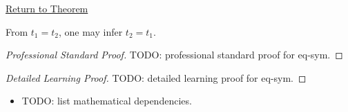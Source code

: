 \newpage
{}
\label{prf:eq-sym}

\begin{remark*}[Return]
\hyperref[thm:eq-sym]{Return to Theorem}
\end{remark*}

\begin{theorem*}
From $t_1 = t_2$, one may infer $t_2 = t_1$.
\end{theorem*}

\begin{proof}[Professional Standard Proof]
\LRAProofBodyStart
TODO: professional standard proof for eq-sym.
\end{proof}

\begin{proof}[Detailed Learning Proof]
\LRAProofBodyStart
TODO: detailed learning proof for eq-sym.
\end{proof}

\begin{remark*}
\end{remark*}

\begin{dependencies}
\begin{itemize}
  \item TODO: list mathematical dependencies.
\end{itemize}
\end{dependencies}

\clearpage
